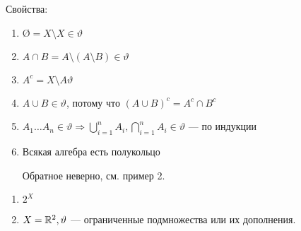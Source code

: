 Свойства:
\begin{enumerate}
    \item \(\text{\O} = X\setminus X\in \vartheta\)
    \item \(A\cap B = A\setminus (A\setminus B)\in \vartheta\)
    \item \(A^c = X\setminus A\vartheta\)
    \item \(A\cup B\in\vartheta\), потому что \((A\cup B)^c = A^c \cap B^c\)
    \item \(A_1\dots A_n \in \vartheta \Rightarrow \bigcup\limits_{i = 1}^n A_i, \bigcap\limits_{i = 1}^n A_i\in \vartheta\) --- по индукции
    \item Всякая алгебра есть полукольцо

          Обратное неверно, см. пример 2.
\end{enumerate}

\begin{example}
    \begin{enumerate}
        \item \(2^X\)
        \item \(X = \mathbb{R}^2, \vartheta\) --- ограниченные подмножества или их дополнения.
    \end{enumerate}
\end{example}

